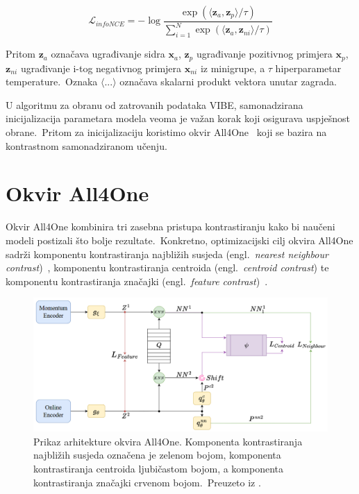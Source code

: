 \documentclass[diplomskirad]{fer}
\begin{document}
\begin{equation}
  \mathcal{L}_{infoNCE} = - \log{\frac{\exp(\langle \bm{z}_{a}, \bm{z}_{p} \rangle / \tau)}{\sum_{i=1}^{N}{\exp(\langle \bm{z}_{a}, \bm{z}_{ni} \rangle / \tau)}}}
  \label{eq:infoNCE}
\end{equation}

Pritom $\bm{z}_{a}$ označava ugrađivanje sidra $\bm{x}_{a}$, $\bm{z}_{p}$ ugrađivanje pozitivnog primjera $\bm{x}_{p}$, $\bm{z}_{ni}$ ugrađivanje i-tog negativnog primjera $\bm{x}_{ni}$ iz minigrupe, a $\tau$ hiperparametar temperature.\ 
Oznaka $\langle ... \rangle$ označava skalarni produkt vektora unutar zagrada.\
  
U algoritmu za obranu od zatrovanih podataka VIBE, samonadzirana inicijalizacija parametara modela veoma je važan korak koji osigurava uspješnost obrane.\ 
Pritom za inicijalizaciju koristimo okvir All4One~\cite{estepa2023all4one} koji se bazira na kontrastnom samonadziranom učenju.\

\section{Okvir All4One}
\label{sek:all4one}

Okvir All4One kombinira tri zasebna pristupa kontrastiranju kako bi naučeni modeli postizali što bolje rezultate.\ 
Konkretno, optimizacijski cilj okvira All4One sadrži komponentu kontrastiranja najbližih susjeda (engl.\ \textit{nearest neighbour contrast})~\cite{dwibedi2021little}, komponentu kontrastiranja centroida (engl.\ \textit{centroid contrast}) te komponentu kontrastiranja značajki (engl.\ \textit{feature contrast})~\cite{zbontar2021barlow}.\ 

\begin{figure}[h]
  \centering
  \includegraphics[scale=0.7]{./Slike/all4one.png}
  \caption{Prikaz arhitekture okvira All4One. Komponenta kontrastiranja najbližih susjeda označena je zelenom bojom, komponenta kontrastiranja centroida ljubičastom bojom, a komponenta kontrastiranja značajki crvenom bojom.\ Preuzeto iz \cite{estepa2023all4one}.}
  \label{fig:all4one}
\end{figure}
\end{document}
